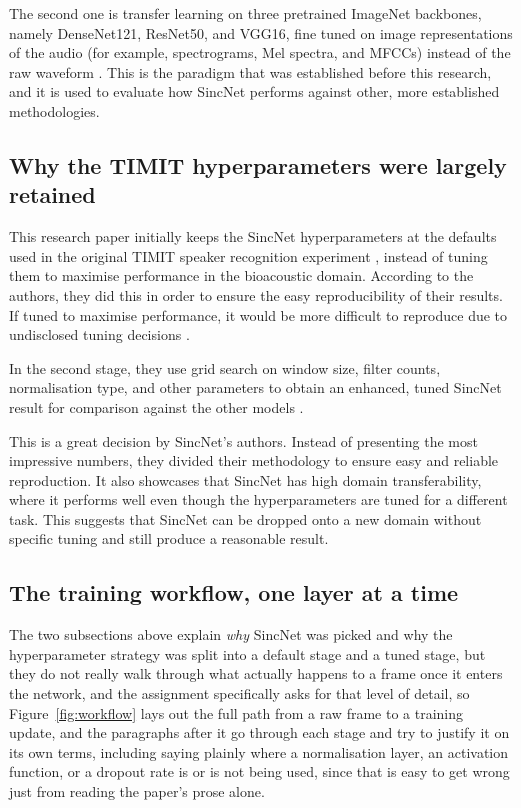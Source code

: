 \documentclass[11pt]{article}
\begin{document}
The second one is transfer learning on three pretrained ImageNet backbones, namely DenseNet121, ResNet50, and VGG16, fine tuned on image representations of the audio (for example, spectrograms, Mel spectra, and MFCCs) instead of the raw waveform \citep{bravosanchez2021}. This is the paradigm that was established before this research, and it is used to evaluate how SincNet performs against other, more established methodologies.

\subsection{Why the TIMIT hyperparameters were largely retained}

This research paper initially keeps the SincNet hyperparameters at the defaults used in the original TIMIT speaker recognition experiment \citep{ravanelli2018}, instead of tuning them to maximise performance in the bioacoustic domain. According to the authors, they did this in order to ensure the easy reproducibility of their results. If tuned to maximise performance, it would be more difficult to reproduce due to undisclosed tuning decisions \citep{bravosanchez2021}.

In the second stage, they use grid search on window size, filter counts, normalisation type, and other parameters to obtain an enhanced, tuned SincNet result for comparison against the other models \citep{bravosanchez2021}.

This is a great decision by SincNet's authors. Instead of presenting the most impressive numbers, they divided their methodology to ensure easy and reliable reproduction. It also showcases that SincNet has high domain transferability, where it performs well even though the hyperparameters are tuned for a different task. This suggests that SincNet can be dropped onto a new domain without specific tuning and still produce a reasonable result.

\subsection{The training workflow, one layer at a time}

The two subsections above explain \emph{why} SincNet was picked and why the hyperparameter strategy was split into a default stage and a tuned stage, but they do not really walk through what actually happens to a frame once it enters the network, and the assignment specifically asks for that level of detail, so Figure~\ref{fig:workflow} lays out the full path from a raw frame to a training update, and the paragraphs after it go through each stage and try to justify it on its own terms, including saying plainly where a normalisation layer, an activation function, or a dropout rate is or is not being used, since that is easy to get wrong just from reading the paper's prose alone.
\end{document}
